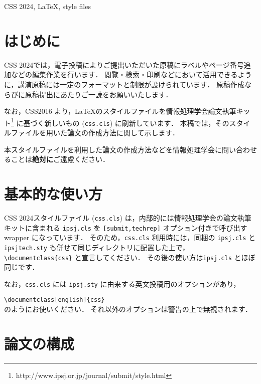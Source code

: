 \documentclass{css}
\def\|{\verb|}
\newcommand{\cssname}[0]{CSS 2024}
\begin{document}
\begin{ekeyword}
\cssname, \LaTeX, style files
\end{ekeyword}

%% if you use english opsion, you should put your English abstract in the abstract environment.
%% eabstract is not displayed in english mode.

\maketitle

%1
\section{はじめに}

\cssname では，電子投稿によりご提出いただいた原稿にラベルやページ番号追加などの編集作業を行います．
閲覧・検索・印刷などにおいて活用できるように，講演原稿には一定のフォーマットと制限が設けられています．
原稿作成ならびに原稿提出にあたりご一読をお願いいたします．

なお，CSS2016 より，\LaTeX のスタイルファイルを情報処理学会論文執筆キット\footnote{http://www.ipsj.or.jp/journal/submit/style.html} に基づく新しいもの (\|css.cls|) に刷新しています．
本稿では，そのスタイルファイルを用いた論文の作成方法に関して示します．

本スタイルファイルを利用した論文の作成方法などを情報処理学会に問い合わせることは\textbf{絶対に}ご遠慮ください．

\section{基本的な使い方}

\cssname スタイルファイル (\|css.cls|) は，内部的には情報処理学会の論文執筆キットに含まれる \|ipsj.cls| を \|[submit,techrep]| オプション付きで呼び出す wrapper になっています．
そのため，\|css.cls| 利用時には，同梱の \|ipsj.cls| と \|ipsjtech.sty| も併せて同じディレクトリに配置した上で，\|\documentclass{css}| と宣言してください．
その後の使い方は\|ipsj.cls| とほぼ同じです．

なお，\|css.cls| には \|ipsj.sty| に由来する英文投稿用のオプションがあり，

\noindent
\|\documentclass[english]{css} |\\
のようにお使いください．
それ以外のオプションは警告の上で無視されます．

\section{論文の構成}
\end{document}
